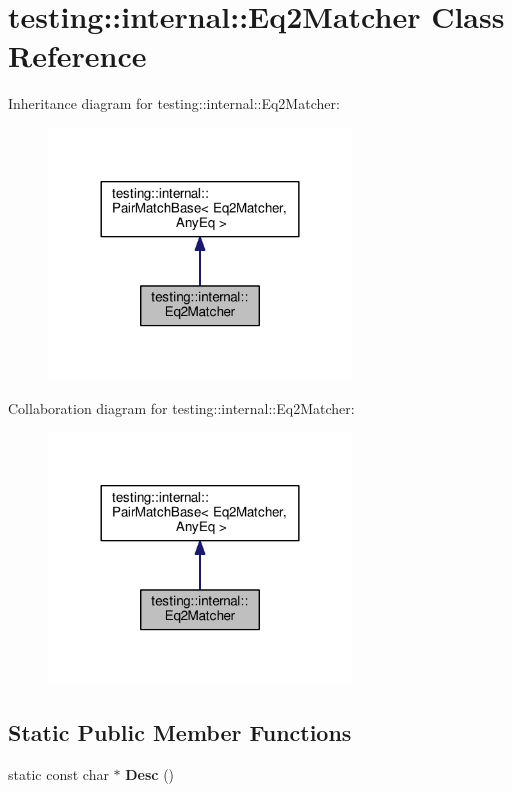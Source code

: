 \hypertarget{classtesting_1_1internal_1_1Eq2Matcher}{}\section{testing\+:\+:internal\+:\+:Eq2\+Matcher Class Reference}
\label{classtesting_1_1internal_1_1Eq2Matcher}


Inheritance diagram for testing\+:\+:internal\+:\+:Eq2\+Matcher\+:\nopagebreak
\begin{figure}[H]
\begin{center}
\leavevmode
\includegraphics[width=228pt]{classtesting_1_1internal_1_1Eq2Matcher__inherit__graph}
\end{center}
\end{figure}


Collaboration diagram for testing\+:\+:internal\+:\+:Eq2\+Matcher\+:\nopagebreak
\begin{figure}[H]
\begin{center}
\leavevmode
\includegraphics[width=228pt]{classtesting_1_1internal_1_1Eq2Matcher__coll__graph}
\end{center}
\end{figure}
\subsection*{Static Public Member Functions}
\begin{DoxyCompactItemize}
\item 
static const char $\ast$ {\bfseries Desc} ()\hypertarget{classtesting_1_1internal_1_1Eq2Matcher_a87c049778ac3d124641b21e47ef558dc}{}\label{classtesting_1_1internal_1_1Eq2Matcher_a87c049778ac3d124641b21e47ef558dc}

\end{DoxyCompactItemize}
